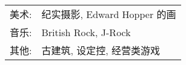%
%



\begin{tabular}{rl}
    \textsc{美术:} & 纪实摄影, Edward Hopper 的画 \\
    \textsc{音乐:} & British Rock, J-Rock\\
    \textsc{其他:} & 古建筑, 设定控, 经营类游戏
\end{tabular}